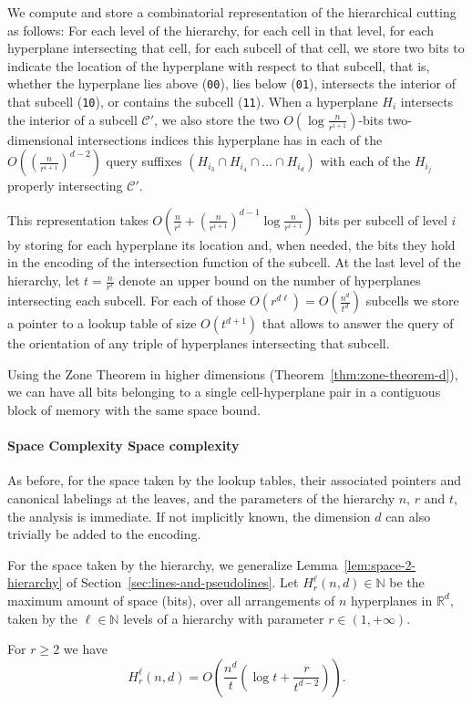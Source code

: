 We compute and store a combinatorial representation of the hierarchical cutting
as follows: For each level of the hierarchy, for each cell in that level, for
each hyperplane intersecting that cell, for each subcell of that cell, we store
two bits to indicate the location of the hyperplane with respect to that
subcell\ifeurocg\else, that is, whether the hyperplane lies above
(\texttt{00}), lies below (\texttt{01}), intersects the interior of that
subcell (\texttt{10}), or contains the subcell (\texttt{11})\fi.
%
When a hyperplane \(H_{i}\) intersects the interior of a subcell \(\mathcal{C}'\),
we also store the two \(O(\log \frac{n}{r^{i+1}})\)-bits two-dimensional
intersections indices this hyperplane has in each of the
\(O\left({\left(\frac{n}{r^{i+1}}\right)}^{d-2}\right)\)
query suffixes \((H_{i_3} \cap H_{i_4} \cap \ldots \cap H_{i_d})\) with each of the
\(H_{i_j}\) properly intersecting \(\mathcal{C}'\).

This representation takes
\(O\left(
  \frac{n}{r^i}
  +
  {\left(\frac{n}{r^{i+1}}\right)}^{d-1} \log{\frac{n}{r^{i+1}}}
\right)\)
bits per subcell of level \(i\) by storing for each
hyperplane its location and, when needed, the bits they hold in
the encoding of the intersection function of the subcell.
At the last level of the hierarchy, let \(t =
\frac{n}{r^\ell}\) denote an upper bound on the number of hyperplanes
intersecting each subcell. For each of those \(O(r^{d \ell}) =
O(\frac{n^d}{t^d})\) subcells we store a pointer to a lookup table of size
\(O(t^{d+1})\) that allows to answer the query of the orientation of any
triple of hyperplanes intersecting that subcell.

Using the Zone Theorem in higher dimensions (Theorem~\ref{thm:zone-theorem-d}),
we can have all bits belonging to a single cell-hyperplane pair in a contiguous
block of memory with the same space bound.

\paragraph*{\iftitlecase%
Space Complexity\else%
Space complexity\fi}
As before, for the space taken by the lookup tables, their
associated pointers and canonical labelings at the leaves, and the parameters
of the hierarchy \(n\), \(r\) and \(t\), the analysis is immediate. If not
implicitly known, the dimension \(d\) can also trivially be added to the
encoding.

For the space taken by the hierarchy,
we generalize Lemma~\ref{lem:space-2-hierarchy} of
Section~\ref{sec:lines-and-pseudolines}. Let \(H_r^\ell(n,d) \in \mathbb{N}\) be the maximum
amount of space (bits), over all arrangements of \(n\) hyperplanes in \(\mathbb{R}^d\),
taken by the \(\ell \in \mathbb{N}\) levels of a hierarchy with parameter \(r \in
(1,+\infty)\).
%
\begin{lemma}\label{lem:space-d-hierarchy}
For \( r \geq 2 \) we have
\begin{displaymath}
H_r^\ell(n,d)
=
O\left(\frac{n^d}{t} \left(\log t + \frac{r}{t^{d-2}}\right)\right).
\end{displaymath}
\end{lemma}

